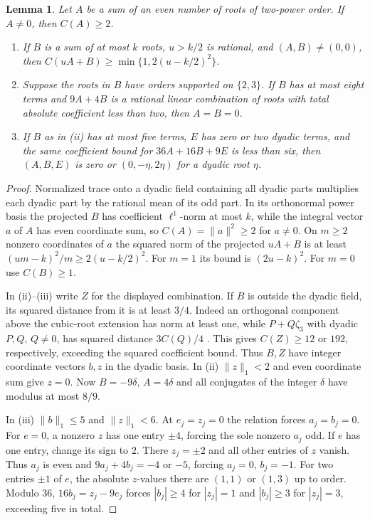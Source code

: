 \documentclass[11pt]{amsart}
\numberwithin{equation}{section}
\newtheorem{lemma}[theorem]{Lemma}
\theoremstyle{definition}
\theoremstyle{plain}
\begin{document}
\begin{lemma}\label{result:coupled-gap}
Let $A$ be a sum of an even number of roots of two-power order. If $A\ne0$, then $C(A)\ge2$.
\begin{enumerate}[label=\textup{(\roman*)},nosep]
\item If $B$ is a sum of at most $k$ roots, $u>k/2$ is rational,
and $(A,B)\ne(0,0)$, then $C(uA+B)\ge\min\{1,2(u-k/2)^2\}$.
\item Suppose the roots in $B$ have orders supported on $\{2,3\}$.
If $B$ has at most eight terms and $9A+4B$ is a rational linear
combination of roots with total absolute coefficient less than two,
then $A=B=0$.
\item If $B$ as in \textup{(ii)} has at most five terms, $E$ has zero
or two dyadic terms, and the same coefficient bound for $36A+16B+9E$
is less than six, then $(A,B,E)$ is zero or $(0,-\eta,2\eta)$ for
a dyadic root $\eta$.
\end{enumerate}
\end{lemma}
\begin{proof}
Normalized trace onto a dyadic field containing all dyadic parts
multiplies each dyadic part by the rational mean of its odd part.
In its orthonormal power basis the projected $B$ has coefficient
$\ell^1$-norm at most $k$, while the integral vector $a$ of $A$ has
even coordinate sum, so $C(A)=\|a\|^2\ge2$ for $a\ne0$. On $m\ge2$ nonzero coordinates of $a$ the
squared norm of the projected $uA+B$ is at least
$(um-k)^2/m\ge2(u-k/2)^2$. For $m=1$ its bound is $(2u-k)^2$.
For $m=0$ use $C(B)\ge1$.

In (ii)--(iii) write $Z$ for the displayed combination. If $B$ is
outside the dyadic field, its squared distance from it is at least
$3/4$. Indeed an orthogonal component above the cubic-root extension
has norm at least one, while $P+Q\zeta_3$ with dyadic $P,Q$, $Q\ne0$,
has squared distance $3C(Q)/4$ \cite[Lemma~5.2.1]{CMSCyclotomic}.
This gives $C(Z)\ge12$ or $192$, respectively, exceeding the squared
coefficient bound. Thus $B,Z$ have integer coordinate vectors $b,z$
in the dyadic basis. In (ii) $\|z\|_1<2$ and even coordinate sum
give $z=0$. Now $B=-9\delta$, $A=4\delta$ and all conjugates
of the integer $\delta$ have modulus at most $8/9$.

In (iii) $\|b\|_1\le5$ and $\|z\|_1<6$. At $e_j=z_j=0$ the
relation forces $a_j=b_j=0$. For $e=0$, a nonzero $z$ has one
entry $\pm4$, forcing the sole nonzero $a_j$ odd. If $e$ has
one entry, change its sign to $2$. There $z_j=\pm2$ and all other
entries of $z$ vanish. Thus $a_j$ is even and $9a_j+4b_j=-4$
or $-5$, forcing $a_j=0$, $b_j=-1$. For two entries $\pm1$ of
$e$, the absolute $z$-values there are $(1,1)$ or $(1,3)$ up to order.
Modulo $36$, $16b_j=z_j-9e_j$ forces $|b_j|\ge4$ for $|z_j|=1$
and $|b_j|\ge3$ for $|z_j|=3$, exceeding five in total.
\end{proof}
\end{document}
